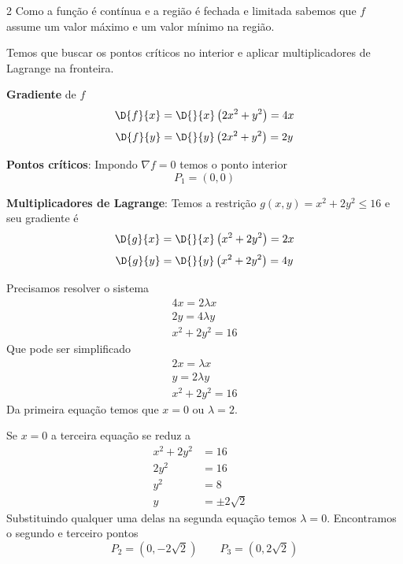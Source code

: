 \documentclass[a4paper,12pt,fleqn]{article}
\begin{document}
\begin{answer}
\setlength\columnsep{3em}
\setlength{\jot}{5pt}
\begin{multicols*}{2}
  \raggedcolumns
  Como a função é contínua e a região é fechada e limitada sabemos que
  $f$ assume um valor máximo e um valor mínimo na região.

  \vspace{\baselineskip}
  Temos que buscar os pontos críticos no interior e aplicar multiplicadores
  de Lagrange na fronteira.

  \vspace{\baselineskip}
  \textbf{Gradiente} de $f$
  \[
    \D{f}{x}
    = \D{}{x}\left(2x^2 + y^2\right)
    = 4x
  \]
  \[
    \D{f}{y}
    = \D{}{y}\left(2x^2 + y^2\right)
    = 2y
  \]

  \vspace{\baselineskip}
  \textbf{Pontos críticos}:
  Impondo \(\nabla f = 0\) temos o ponto interior
  \[
    P_1 = (0, 0)
  \]

  \vspace{\baselineskip}
  \textbf{Multiplicadores de Lagrange}:
  Temos a restrição \(g(x, y) = x^2 + 2y^2 \leq 16\) e seu gradiente é
  \[
    \D{g}{x}
    = \D{}{x}\left(x^2 + 2y^2\right)
    = 2x
  \]
  \[
    \D{g}{y}
    = \D{}{y}\left(x^2 + 2y^2\right)
    = 4y
  \]

  Precisamos resolver o sistema
  \begin{gather*}
    4x = 2\lambda x \\
    2y = 4\lambda y \\
    x^2 + 2y^2 = 16
  \end{gather*}
  Que pode ser simplificado
  \begin{gather*}
    2x =  \lambda x \\
     y = 2\lambda y \\
    x^2 + 2y^2 = 16
  \end{gather*}
  Da primeira equação temos que $x=0$ ou $\lambda=2$.

  Se $x=0$ a terceira equação se reduz a
  \begin{align*}
    x^2 + 2y^2 & = 16           &  \\
    2y^2       & = 16           &  \\
    y^2        & = 8            &  \\
    y          & = \pm 2\sqrt{2} &
  \end{align*}
  Substituindo qualquer uma delas na segunda equação
  temos $\lambda = 0$. Encontramos o segundo e terceiro pontos
  \[
    P_2 = \left(0, -2\sqrt{2}\right)
    \qquad
    P_3 = \left(0, 2\sqrt{2}\right)
  \]


\end{multicols*}
\end{answer}
\end{document}
